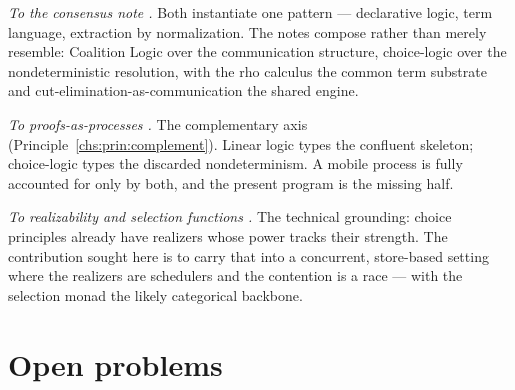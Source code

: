 \emph{To the consensus note \cite{consensus}.} Both instantiate one pattern --- declarative logic, term language,
extraction by normalization. The notes compose rather than merely resemble: Coalition Logic over the communication
structure, choice-logic over the nondeterministic resolution, with the rho calculus the common term substrate and
cut-elimination-as-communication the shared engine.

\emph{To proofs-as-processes \cite{abramskyPaP,bellinscott,cairespfenning,wadler}.} The complementary axis
(Principle~\ref{chs:prin:complement}). Linear logic types the confluent skeleton; choice-logic types the discarded
nondeterminism. A mobile process is fully accounted for only by both, and the present program is the missing half.

\emph{To realizability and selection functions \cite{martinlof,spector,bbc,krivine,escardo}.} The technical
grounding: choice principles already have realizers whose power tracks their strength. The contribution sought here
is to carry that into a concurrent, store-based setting where the realizers are schedulers and the contention is a
race --- with the selection monad \cite{escardo} the likely categorical backbone.

\section{Open problems}\label{chs:sec:open}

